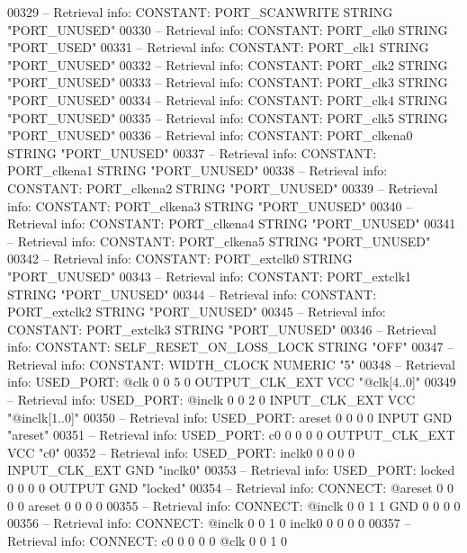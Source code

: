\begin{DoxyCode}
{00329 \textcolor{keyword}{-- Retrieval info: CONSTANT: PORT\_SCANWRITE STRING "PORT\_UNUSED"}
00330 \textcolor{keyword}{-- Retrieval info: CONSTANT: PORT\_clk0 STRING "PORT\_USED"}
00331 \textcolor{keyword}{-- Retrieval info: CONSTANT: PORT\_clk1 STRING "PORT\_UNUSED"}
00332 \textcolor{keyword}{-- Retrieval info: CONSTANT: PORT\_clk2 STRING "PORT\_UNUSED"}
00333 \textcolor{keyword}{-- Retrieval info: CONSTANT: PORT\_clk3 STRING "PORT\_UNUSED"}
00334 \textcolor{keyword}{-- Retrieval info: CONSTANT: PORT\_clk4 STRING "PORT\_UNUSED"}
00335 \textcolor{keyword}{-- Retrieval info: CONSTANT: PORT\_clk5 STRING "PORT\_UNUSED"}
00336 \textcolor{keyword}{-- Retrieval info: CONSTANT: PORT\_clkena0 STRING "PORT\_UNUSED"}
00337 \textcolor{keyword}{-- Retrieval info: CONSTANT: PORT\_clkena1 STRING "PORT\_UNUSED"}
00338 \textcolor{keyword}{-- Retrieval info: CONSTANT: PORT\_clkena2 STRING "PORT\_UNUSED"}
00339 \textcolor{keyword}{-- Retrieval info: CONSTANT: PORT\_clkena3 STRING "PORT\_UNUSED"}
00340 \textcolor{keyword}{-- Retrieval info: CONSTANT: PORT\_clkena4 STRING "PORT\_UNUSED"}
00341 \textcolor{keyword}{-- Retrieval info: CONSTANT: PORT\_clkena5 STRING "PORT\_UNUSED"}
00342 \textcolor{keyword}{-- Retrieval info: CONSTANT: PORT\_extclk0 STRING "PORT\_UNUSED"}
00343 \textcolor{keyword}{-- Retrieval info: CONSTANT: PORT\_extclk1 STRING "PORT\_UNUSED"}
00344 \textcolor{keyword}{-- Retrieval info: CONSTANT: PORT\_extclk2 STRING "PORT\_UNUSED"}
00345 \textcolor{keyword}{-- Retrieval info: CONSTANT: PORT\_extclk3 STRING "PORT\_UNUSED"}
00346 \textcolor{keyword}{-- Retrieval info: CONSTANT: SELF\_RESET\_ON\_LOSS\_LOCK STRING "OFF"}
00347 \textcolor{keyword}{-- Retrieval info: CONSTANT: WIDTH\_CLOCK NUMERIC "5"}
00348 \textcolor{keyword}{-- Retrieval info: USED\_PORT: @clk 0 0 5 0 OUTPUT\_CLK\_EXT VCC "@clk[4..0]"}
00349 \textcolor{keyword}{-- Retrieval info: USED\_PORT: @inclk 0 0 2 0 INPUT\_CLK\_EXT VCC "@inclk[1..0]"}
00350 \textcolor{keyword}{-- Retrieval info: USED\_PORT: areset 0 0 0 0 INPUT GND "areset"}
00351 \textcolor{keyword}{-- Retrieval info: USED\_PORT: c0 0 0 0 0 OUTPUT\_CLK\_EXT VCC "c0"}
00352 \textcolor{keyword}{-- Retrieval info: USED\_PORT: inclk0 0 0 0 0 INPUT\_CLK\_EXT GND "inclk0"}
00353 \textcolor{keyword}{-- Retrieval info: USED\_PORT: locked 0 0 0 0 OUTPUT GND "locked"}
00354 \textcolor{keyword}{-- Retrieval info: CONNECT: @areset 0 0 0 0 areset 0 0 0 0}
00355 \textcolor{keyword}{-- Retrieval info: CONNECT: @inclk 0 0 1 1 GND 0 0 0 0}
00356 \textcolor{keyword}{-- Retrieval info: CONNECT: @inclk 0 0 1 0 inclk0 0 0 0 0}
00357 \textcolor{keyword}{-- Retrieval info: CONNECT: c0 0 0 0 0 @clk 0 0 1 0}
}
\end{DoxyCode}
